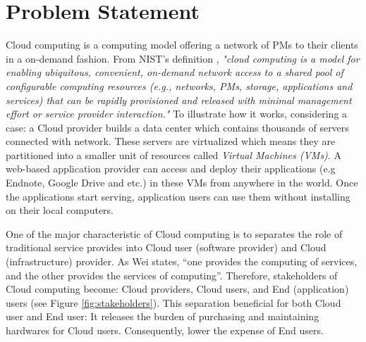 \section{Problem Statement}

Cloud computing is a computing model offering a network of PMs to their 
clients in a on-demand fashion. From NIST's definition \cite{Mell:2011jj}, \textit{"cloud computing is a model for enabling ubiquitous, convenient, on-demand network access to a shared pool of configurable computing resources (e.g., networks, PMs, storage, applications and services) that can be rapidly provisioned and released with minimal management effort or service provider interaction."} 
To illustrate how it works, considering a case: a Cloud provider builds a data center which contains thousands of servers connected with network. These servers are virtualized which means they are partitioned into a smaller unit of resources called \emph{Virtual Machines (VMs)}. A web-based application provider can access and deploy their applications (e.g Endnote, Google Drive and etc.) in these VMs from anywhere in the world. Once the applications start serving, application users can use them without installing on their local computers. 

One of the major characteristic of Cloud computing is to separates the role of traditional service provides into Cloud user (software provider) and Cloud (infrastructure) provider. As Wei \cite{Wei:2010fn} states, ``one provides the computing of services, and the other provides the services of computing''. Therefore, stakeholders of Cloud computing become: Cloud providers, Cloud users, and End (application) users \cite{Jennings:2015ht} (see Figure \ref{fig:stakeholders}). This separation beneficial for both Cloud user and End user: It releases the burden of purchasing and maintaining hardwares for Cloud users. Consequently, lower the expense of End users. 

